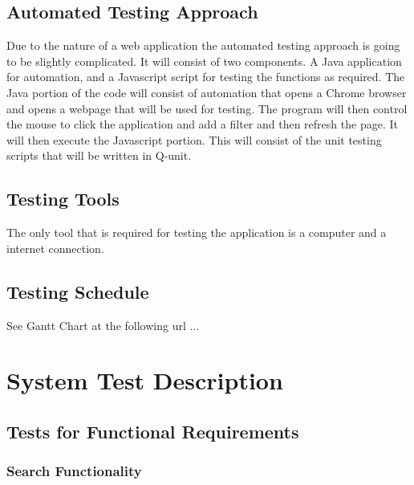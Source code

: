 \documentclass[12pt, titlepage]{article}
\begin{document}
\subsection{Automated Testing Approach}
Due to the nature of a web application the automated testing approach is going to be slightly complicated. It will consist of two components. A Java application for automation, and a Javascript script for testing the functions as required. The Java portion of the code will consist of automation that opens a Chrome browser and opens a webpage that will be used for testing. The program will then control the mouse to click the application and add a filter and then refresh the page. It will then execute the Javascript portion. This will consist of the unit testing scripts that will be written in Q-unit. 
\subsection{Testing Tools}
The only tool that is required for testing the application is a computer and a internet connection.
\subsection{Testing Schedule}
		
See Gantt Chart at the following url ...
\section{System Test Description}
	
\subsection{Tests for Functional Requirements}
\subsubsection{Search Functionality}
		
\end{document}
